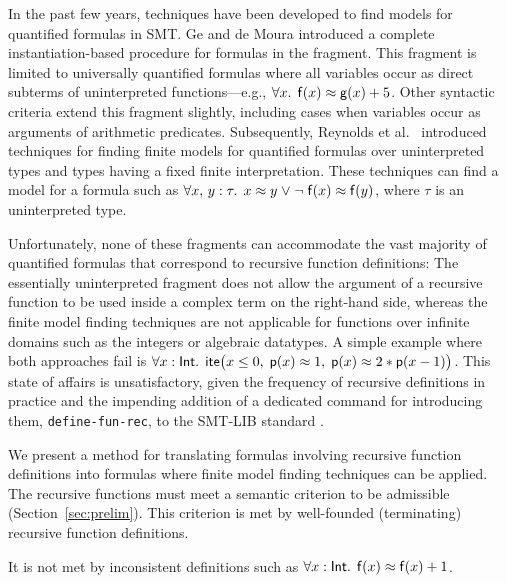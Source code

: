 In the past few years, techniques have been developed to find models for
quantified formulas in SMT.
Ge and de Moura \cite{GeDeM-CAV-09} introduced a complete instantiation-based
procedure for formulas in the  fragment.
This fragment is limited to universally quantified formulas where all
variables occur as direct subterms of uninterpreted
functions---e.g., $\forall x%
.\;\, \con{f}( x )
\teq \con{g}( x ) + 5$.
Other syntactic criteria extend
this fragment slightly, including cases when variables occur as arguments of
arithmetic predicates. Subsequently, Reynolds et al.\
\cite{ReyEtAl-1-RR-13,reynolds-et-al-2013} introduced techniques for finding finite
models for quantified
formulas over uninterpreted types and types having a fixed finite
interpretation. %
These techniques can
find a model for a formula such as $\forall x,\, y : \tau.\;\, x \teq
y \vee \allowbreak \neg \con{f}( x ) \teq \con{f}( y )$, where $\tau$ is an uninterpreted type.

Unfortunately, none of these fragments can accommodate the vast majority of
quantified formulas that correspond to recursive function definitions: The
essentially uninterpreted fragment does not allow the argument of a
recursive function to be used inside a complex term on the right-hand side,
whereas the finite model finding techniques %
are not applicable for functions over infinite domains such as the integers or
algebraic datatypes. A simple example where both approaches fail is
$\forall x : {\mathsf{Int}}.\;\, \mathsf{ite}\bigl(
x \leq 0,\allowbreak\; \mathsf{p}( x ) \approx 1,\allowbreak\; \mathsf{p}( x ) \approx 2 * \mathsf{p}( x - 1 ) \bigr)$.
This state of affairs is unsatisfactory, given the frequency of
recursive definitions in practice and the impending addition of a dedicated
command for introducing them, \texttt{define-fun-rec}, to the SMT-LIB standard \cite{smtlib25}.

We present a method for translating formulas involving recursive function
definitions into formulas where finite model finding techniques can be applied.
The recursive functions must meet a semantic criterion to be admissible
(Section~\ref{sec:prelim}). This criterion is met by well-founded (terminating)
recursive function definitions. \begin{rep}It is not met by inconsistent
definitions such as $\forall x : {\mathsf{Int}}.\;\, \mathsf{f}(x) \approx \mathsf{f}(x) +
1$.\end{rep} %

